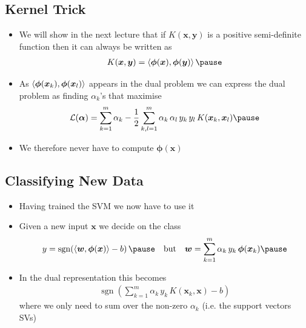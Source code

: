 \begin{slide}
\section{Kernel Trick}

\begin{PauseHighLight}
  \begin{itemize}
  \item We will show in the next lecture that if $K(\bm{x},\bm{y})$ is
    a positive semi-definite function then it can always be written as
    \begin{align*}
      K(\bm{x},\bm{y}) = \inner{\bm{\phi}(\bm{x})}{\bm{\phi}(\bm{y})}\pause
    \end{align*}
  \item As $\left\langle {\bm{\phi}(\bm{x}_k)}, {\bm{\phi}(\bm{x}_l)}\right\rangle$ appears in the
    dual problem we can express the dual problem as finding
    $\alpha_k$'s that maximise
    \begin{align*}
      \mathcal{L}(\bm{\alpha}) = \sum_{k=1}^m \alpha_k 
      - \frac{1}{2} \sum_{k,l=1}^m \alpha_k\,\alpha_l
      \,y_k\,y_l\,K(\bm{x}_k,\bm{x}_l)\pause
    \end{align*}
  \item We therefore never have to compute $\bm{\phi}(\bm{x})$\pause
  \end{itemize}
\end{PauseHighLight}

\end{slide}


\begin{slide}
\section[-2]{Classifying New Data}

\begin{PauseHighLight}
  \begin{itemize}
  \item Having trained the SVM we now have to use it\pause
  \item Given a new input $\bm{x}$ we decide on the class
    \begin{align*}
      &y=\mathrm{\mathop{sgn}}\!\left(\inner{\bm{w}}{\bm{\phi}(\bm{x})}-b\right)\pause
        & \text{but}&& \bm{w} = \sum_{k=1}^m
    \alpha_k\,y_k \, \bm{\phi}(\bm{x}_k)\pause
    \end{align*}
  \item In the dual representation this becomes
    \begin{align*}
      \mathrm{\mathop{sgn}}\!\left(\sum_{k=1}^m \alpha_k\, y_k \,
      K(\bm{x}_k,\bm{x})-b\right)
    \end{align*}
    where we only need to sum over the non-zero $\alpha_k$ (i.e. the
    support vectors SVs)\pause
  \end{itemize}
\end{PauseHighLight}

\end{slide}


